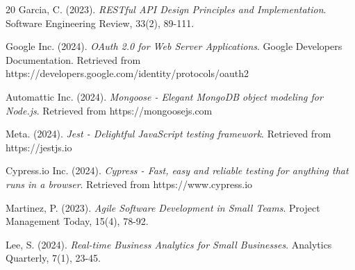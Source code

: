 \begin{thebibliography}{20}
Garcia, C. (2023). \textit{RESTful API Design Principles and Implementation}. Software Engineering Review, 33(2), 89-111.

Google Inc. (2024). \textit{OAuth 2.0 for Web Server Applications}. Google Developers Documentation. Retrieved from https://developers.google.com/identity/protocols/oauth2

Automattic Inc. (2024). \textit{Mongoose - Elegant MongoDB object modeling for Node.js}. Retrieved from https://mongoosejs.com

Meta. (2024). \textit{Jest - Delightful JavaScript testing framework}. Retrieved from https://jestjs.io

Cypress.io Inc. (2024). \textit{Cypress - Fast, easy and reliable testing for anything that runs in a browser}. Retrieved from https://www.cypress.io

Martinez, P. (2023). \textit{Agile Software Development in Small Teams}. Project Management Today, 15(4), 78-92.

Lee, S. (2024). \textit{Real-time Business Analytics for Small Businesses}. Analytics Quarterly, 7(1), 23-45.

\end{thebibliography}